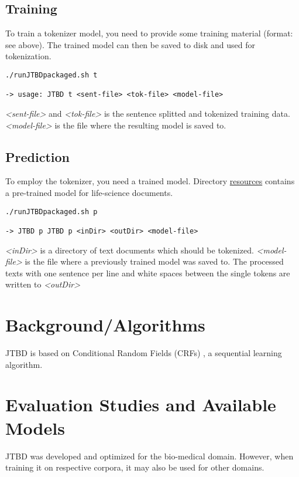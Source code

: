 \documentclass[11pt,a4paper,halfparskip]{scrartcl}
\begin{document}
\subsection{Training}

To train a tokenizer model, you need to provide some training material
(format: see above). The trained model can then be saved to disk and
used for tokenization.

\begin{verbatim}
./runJTBDpackaged.sh t

-> usage: JTBD t <sent-file> <tok-file> <model-file>
\end{verbatim}

\textit{<sent-file>} and \textit{<tok-file>} is the sentence splitted
and tokenized training data. \textit{<model-file>} is the file where
the resulting model is saved to.

\subsection{Prediction}

To employ the tokenizer, you need a trained model. Directory
\url{resources} contains a pre-trained model for life-science documents.

\begin{verbatim}
./runJTBDpackaged.sh p

-> JTBD p JTBD p <inDir> <outDir> <model-file>
\end{verbatim}

\textit{<inDir>} is a directory of text documents which should be
tokenized. \textit{<model-file>} is the file where a previously
trained model was saved to. The processed texts with one sentence per
line and white spaces between the single tokens are written to
\textit{<outDir>}

\section{Background/Algorithms}
\label{sec:background}

JTBD is based on Conditional Random Fields (CRFs) \cite{lafferty01}, a
sequential learning algorithm. 

\section{Evaluation Studies and Available Models}

JTBD was developed and optimized for the bio-medical domain. However,
when training it on respective corpora, it may also be used for other
domains.
\end{document}

